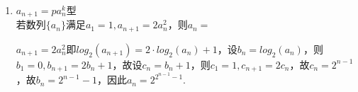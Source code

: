 \begin{enumerate}
\begin{enumerate}
        若数列$\{a_n\}$满足$a_1 = 1, a_{n+1} = \dfrac{a_n}{2a_n + 3}$，则$a_n = $
        \begin{jieda}
            $a_{n+1} = \dfrac{a_n}{2a_n + 3}$即$\dfrac{1}{a_{n+1}} = 2 + \dfrac{3}{a_n}$，设$b_n = \dfrac{1}{a_n}$，则$b_1 = 1, b_{n+1} = 3b_n + 2$，设$c_n = b_n + 1$，则$c_1 = 2, c_{n+1} = 3c_n$，故$\{c_n\}$是等比数列，$c_n = 2 \cdot 3^{n-1}$，故$b_n = 2\cdot 3^{n-1}-1, a_n = \dfrac{1}{2\cdot 3^{n-1}-1}$.
        \end{jieda}
        \item $a_{n+1} = pa_n^k$型 \\
        若数列$\{a_n\}$满足$a_1 = 1, a_{n+1} = 2a_n^2$，则$a_n = $
        \begin{jieda}
            $a_{n+1} = 2a_n^2$即$log_2(a_{n+1}) = 2 \cdot log_2(a_n) + 1$，设$b_n = log_2(a_n)$，则$b_1 = 0, b_{n+1} = 2b_n + 1$，故设$c_n = b_n + 1$，则$c_1 = 1, c_{n+1} = 2c_n$，故$c_n = 2^{n-1}$，故$b_n = 2^{n-1}-1$，因此$a_n = 2^{2^{n-1}-1}$.
        \end{jieda}
    \end{enumerate}


\end{enumerate}
